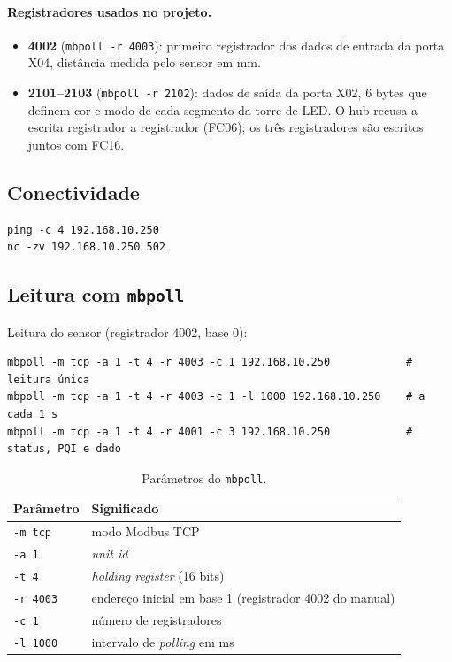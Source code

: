 \documentclass[11pt,a4paper]{article}
\newcommand{\code}[1]{\texttt{#1}}
\begin{document}
\paragraph{Registradores usados no projeto.}
\begin{itemize}
  \item \textbf{4002} (\code{mbpoll -r 4003}): primeiro registrador dos dados
    de entrada da porta X04, distância medida pelo sensor em mm.
  \item \textbf{2101--2103} (\code{mbpoll -r 2102}): dados de saída da porta X02,
    6 bytes que definem cor e modo de cada segmento da torre de LED.
    O hub recusa a escrita registrador a registrador (FC06); os três
    registradores são escritos juntos com FC16.
\end{itemize}

\subsection{Conectividade}

\begin{lstlisting}
ping -c 4 192.168.10.250
nc -zv 192.168.10.250 502
\end{lstlisting}

\subsection{Leitura com \code{mbpoll}}

Leitura do sensor (registrador 4002, base 0):

\begin{lstlisting}
mbpoll -m tcp -a 1 -t 4 -r 4003 -c 1 192.168.10.250            # leitura única
mbpoll -m tcp -a 1 -t 4 -r 4003 -c 1 -l 1000 192.168.10.250    # a cada 1 s
mbpoll -m tcp -a 1 -t 4 -r 4001 -c 3 192.168.10.250            # status, PQI e dado
\end{lstlisting}

\begin{table}[H]
\centering
\small
\begin{tabular}{@{}ll@{}}
\toprule
Parâmetro & Significado \\
\midrule
\code{-m tcp} & modo Modbus TCP \\
\code{-a 1} & \emph{unit id} \\
\code{-t 4} & \emph{holding register} (16 bits) \\
\code{-r 4003} & endereço inicial em base 1 (registrador 4002 do manual) \\
\code{-c 1} & número de registradores \\
\code{-l 1000} & intervalo de \emph{polling} em ms \\
\bottomrule
\end{tabular}
\caption{Parâmetros do \code{mbpoll}.}
\end{table}
\end{document}

